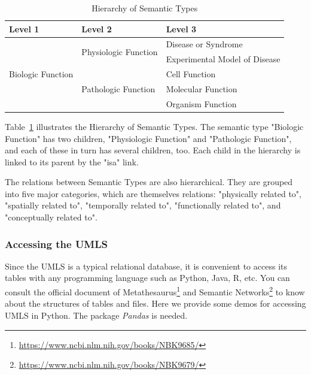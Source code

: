 \begin{table}[ht]
\centering
\caption{Hierarchy of Semantic Types}
\label{tab:semantic hierachy}

\begin{tabular}{@{}cll@{}}
\toprule
\multicolumn{1}{l}{Level 1} & Level 2                              & Level 3                       \\ \midrule
\multirow{5}{*}{Biologic Function} & \multirow{2}{*}{Physiologic Function} & Disease or Syndrome \\
                            &                                      & Experimental Model of Disease \\ \cmidrule(l){2-3} 
                            & \multirow{3}{*}{Pathologic Function} & Cell Function                 \\
                            &                                      & Molecular Function            \\
                            &                                      & Organism Function             \\ \bottomrule
\end{tabular}

\end{table}

Table~\ref{tab:semantic hierachy} illustrates the Hierarchy of Semantic Types. The semantic type "Biologic Function" has two children, "Physiologic Function" and "Pathologic Function", and each of these in turn has several children, too. 
Each child in the hierarchy is linked to its parent by the "isa" link.

The relations between Semantic Types are also hierarchical.
They are grouped into five major categories, which are themselves relations: "physically related to", "spatially related to", "temporally related to", "functionally related to", and "conceptually related to".

\subsubsection{Accessing the UMLS}
Since the UMLS is a typical relational database, it is convenient to access its tables with any programming language such as Python, Java, R, etc. 
You can consult the official document of Metathesaurus\footnote{\url{https://www.ncbi.nlm.nih.gov/books/NBK9685/}} and Semantic Networks\footnote{\url{https://www.ncbi.nlm.nih.gov/books/NBK9679/}} to know about the structures of tables and files.
Here we provide some demos for accessing UMLS in Python. The package \emph{Pandas} is needed.

